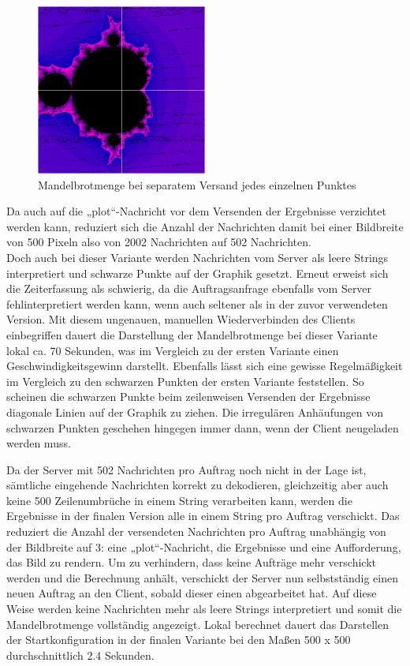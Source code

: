 \documentclass[12pt, onecolumn,notitlepage]{scrartcl}
\begin{document}
\begin{figure}[htbp] 
	\centering
	\includegraphics[width=0.5\textwidth]{zeilenVersandt.PNG}
	\caption{Mandelbrotmenge bei separatem Versand jedes einzelnen Punktes}
	\label{fig:Bild2}
\end{figure}

Da auch auf die „plot“-Nachricht vor dem Versenden der Ergebnisse verzichtet werden kann, reduziert sich die Anzahl der Nachrichten damit bei einer Bildbreite von 500 Pixeln also von 2002 Nachrichten auf 502 Nachrichten.\\
Doch auch bei dieser Variante werden Nachrichten vom Server als leere Strings interpretiert und schwarze Punkte auf der Graphik gesetzt. Erneut erweist sich die Zeiterfassung als schwierig, da die Auftragsanfrage ebenfalls vom Server fehlinterpretiert werden kann, wenn auch seltener als in der zuvor verwendeten Version. Mit diesem ungenauen, manuellen Wiederverbinden des Clients einbegriffen dauert die Darstellung der Mandelbrotmenge bei dieser Variante lokal ca. 70 Sekunden, was im Vergleich zu der ersten Variante einen Geschwindigkeitsgewinn darstellt. Ebenfalls lässt sich eine gewisse Regelmäßigkeit im Vergleich zu den schwarzen Punkten der ersten Variante feststellen. So scheinen die schwarzen Punkte beim zeilenweisen Versenden der Ergebnisse  diagonale Linien auf der Graphik zu ziehen. Die irregulären Anhäufungen von schwarzen Punkten geschehen hingegen immer dann, wenn der Client neugeladen werden muss. \par
Da der Server mit 502 Nachrichten pro Auftrag noch nicht in der Lage ist, sämtliche eingehende Nachrichten korrekt zu dekodieren, gleichzeitig aber auch keine 500 Zeilenumbrüche in einem String verarbeiten kann, werden die Ergebnisse in der finalen Version alle in einem String pro Auftrag verschickt. Das reduziert die Anzahl der versendeten Nachrichten pro Auftrag unabhängig von der Bildbreite auf 3: eine „plot“-Nachricht, die Ergebnisse und eine Aufforderung, das Bild zu rendern. Um zu verhindern, dass keine Aufträge mehr verschickt werden und die Berechnung anhält, verschickt der Server nun selbstständig einen neuen Auftrag an den Client, sobald dieser einen abgearbeitet hat. Auf diese Weise werden keine Nachrichten mehr als leere Strings interpretiert und somit die Mandelbrotmenge vollständig angezeigt. Lokal berechnet dauert das Darstellen der Startkonfiguration in der finalen Variante bei den Maßen 500 x 500 durchschnittlich 2.4 Sekunden.\par
\end{document}
